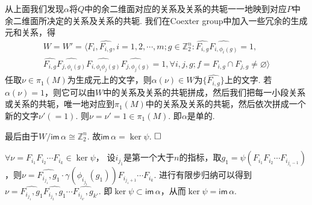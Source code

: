 \documentclass{article}
\theoremstyle{plain}%
\theoremstyle{definition}
\theoremstyle{remark}
\begin{document}
{从上面我们发现$\alpha$将$Q$中的余二维面对应的关系及关系的共轭一一地映到对应$P$中余二维面所决定的关系及关系的共轭.
我们在Coexter group中加入一些冗余的生成元和关系，得
\begin{multline}
W=W'=\langle F_i,\widehat{F_{i,g}},i=1,2,\cdots,m;g\in\mathbb{Z}_2^n :\widehat{F_{i,g}}\widehat{F_{i,\phi_i(g)}}=1, \\\widehat{F_{i,g}}\widehat{F_{j,\phi_i(g)}}\widehat{F_{i,\phi_i\phi_j(g)}}\widehat{F_{j,\phi_j(g)}}=1,\forall i,j,g;f=F_{i,g}\cap F_{j,g}\neq \varnothing\rangle
\end{multline}
任取$\nu\in \pi_1(M)$为生成元上的文字，则$\alpha(\nu)\in W$为$\{\widehat{F_{i,g}}\}$上的文字. 若$\alpha(\nu)=1$，则它可以由$W$中的关系及关系的共轭拼成，然后我们把每一小段关系或关系的共轭，唯一地对应到$\pi_1(M)$中的关系及关系的共轭，然后依次拼成一个新的文字$\nu'(=1)$. 则$\nu=\nu'=1\in \pi_1(M)$.
即$\alpha$是单的.


最后由于$W/\mathsf{im}\,\alpha\cong \mathbb{Z}_2^n$.
故$\mathsf{im}\, \alpha= \ker \psi$. $\hfill{} \Box$

{\rem $\forall \nu=F_{i_1}F_{i_2}\cdots F_{i_k}\in \ker \psi $，
设$i_{j_1}$是第一个大于$n$的指标，取$g_1=\psi(F_{i_1}F_{i_2}\cdots F_{i_{j_1-1}})$，则$\nu=\widehat{F_{i_{j_1}},g_1}\cdot \gamma(\phi_{i_{j_1}}(g_1))F_{i_{{j_1}+1}}\cdots F_{i_k}$. 进行有限步归纳可以得到$\nu=\widehat{F_{i_{j_1}},g_1}\widehat{F_{i_{j_2}},g_1}\cdots \widehat{F_{i_{j_{k'}}},g_{k'}}$. 即$\ker \psi\subset \mathsf{im}\,\alpha$，从而$\ker \psi= \mathsf{im}\,\alpha$.}



}
\end{document}
